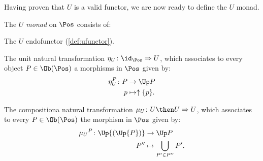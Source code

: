 Having proven that $U$ is a valid functor, we are now ready to define the $U$ monad.
\begin{definition}[$U$ monad]
The \emph{$U$ monad} on $\Pos$ consists of:
\begin{compactenum}
    \item The $U$ endofunctor (\cref{def:ufunctor}).
    \item The unit natural transformation $\eta_U \colon \id_{\Pos}\Rightarrow U$, which associates to every object $P\in \Ob(\Pos)$ a morphisms in $\Pos$ given by:
    \begin{equation}
        \begin{aligned}
            \eta_{U}^P\colon P &\to \Up P\\
            p&\mapsto \uparrow \{p\}.
        \end{aligned}
    \end{equation}
\item The compositiona natural transformation $\mu_U\colon U\then U\Rightarrow U$, which associates to every $P\in \Ob(\Pos)$ the morphism in $\Pos$ given by:
\begin{equation}
    \begin{aligned}
    \mu{_U}^P\colon \Up{(\Up{P})}&\to \Up P\\
    P''&\mapsto \bigcup_{P'\in P''}P'.
    \end{aligned}
\end{equation}
\end{compactenum}
\end{definition}

